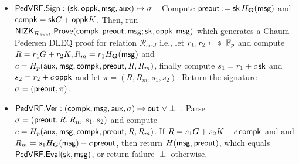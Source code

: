\begin{itemize}
	\item ${\mathsf{PedVRF}}.{\mathsf{Sign}} : (\mathsf{sk},\mathsf{oppk},\mathsf{msg},\mathsf{aux}) \mapsto \sigma$ \,.
	Compute ${\mathsf{preout}} := \mathsf{sk} \, H_{{\mathbf{G}}}(\mathsf{msg})$ and $ \mathsf{compk} = \mathsf{sk} G + \mathsf{oppk}K $. Then, run ${\mathsf{NIZK}}_{\mathcal{R}_{eval}}.{\mathsf{Prove}}(\mathsf{compk}, {\mathsf{preout}}, \mathsf{msg};\mathsf{sk},\mathsf{oppk},\mathsf{msg})  $ which generates a Chaum-Pedersen DLEQ proof
	for relation $\mathcal{R}_{eval}$ i.e.,
	let $r_1,r_2 \leftsample \F_p$
	and compute $R = r_1 G + r_2 K, R_m = r_1 H_{{\mathbf{G}}}(\mathsf{msg}) $ and $c = H_p(\mathsf{aux},\mathsf{msg},\mathsf{compk},{\mathsf{preout}},R,R_m)$, finally compute $s_1 = r_1 + c \, \mathsf{sk}$ and $s_2 = r_2 + c \, \mathsf{oppk}$ and let $ \pi = (R,R_m,s_1,s_2) $.
	Return the signature $\sigma = ({\mathsf{preout}},\pi) $.
	
	\item ${\mathsf{PedVRF}}.{\mathsf{Ver}} : (\mathsf{compk},\mathsf{msg},\mathsf{aux},\sigma) \mapsto {\ensuremath{\mathsf{out}}} \,\, \lor \perp$ \,.
	Parse $\sigma = ({\mathsf{preout}}, R,R_m,s_1,s_2) $ and compute 
	$c = H_p(\mathsf{aux},\mathsf{msg},\mathsf{compk},{\mathsf{preout}},R,R_m)$.
	If $ R = s_1 G + s_2 K - c \, \mathsf{compk}$ and
	and $ R_m = s_1 H_{{\mathbf{G}}}(\mathsf{msg}) - c \, {\mathsf{preout}}$,
	then return $H(\mathsf{msg},{\mathsf{preout}})$, which equals ${\mathsf{PedVRF}}.{\mathsf{Eval}}(\mathsf{sk},\mathsf{msg})$,
	or return failure $\perp$ otherwise.
\end{itemize}




